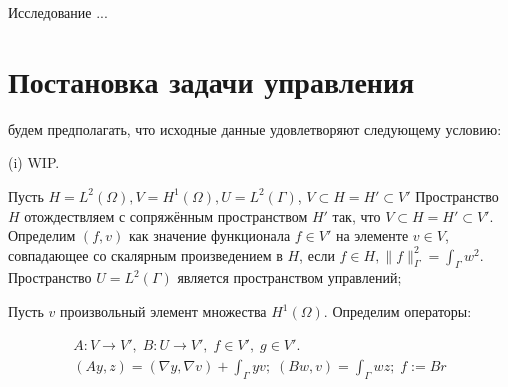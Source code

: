 \documentclass[10pt]{article}
\begin{document}
    Исследование ...

    \section{Постановка задачи управления}\label{sec:formalization}
    будем предполагать, что исходные данные удовлетворяют следующему условию:

    (i) WIP\@.

    Пусть $H = L^2(\Omega), V = H^1(\Omega), U = L^2(\Gamma)$, $V \subset H = H' \subset V'$
    Пространство $H$ отождествляем с сопряжённым пространством $H'$ так,
    что $V \subset H = H' \subset V'$.
    Определим $(f,v)$ как значение функционала $f \in V'$ на элементе $v \in V$,
    совпадающее со скалярным произведением в $H$, если $f\in H, \|f\|_\Gamma^2 = \int_\Gamma w^2$.
    Пространство $U = L^2(\Gamma)$ является пространством управлений;


    Пусть $v$ произвольный элемент множества $H^1(\Omega)$.
    Определим операторы:

    \begin{gather*}
        A \colon V \to V', \; B \colon U \to V', \; f \in V', \; g \in V'.\\
        (A y,z) = (\nabla y, \nabla v) + \int_\Gamma y v; \;
        (B w, v) = \int_\Gamma w z; \; f := Br
    \end{gather*}
\end{document}
